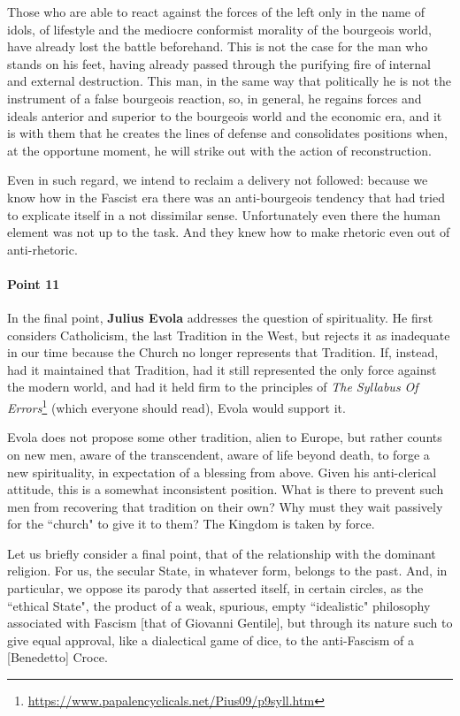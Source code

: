 Those who are able to react against the forces of the left only in the name of idols, of lifestyle and the mediocre conformist morality of the bourgeois world, have already lost the battle beforehand. This is not the case for the man who stands on his feet, having already passed through the purifying fire of internal and external destruction. This man, in the same way that politically he is not the instrument of a false bourgeois reaction, so, in general, he regains forces and ideals anterior and superior to the bourgeois world and the economic era, and it is with them that he creates the lines of defense and consolidates positions when, at the opportune moment, he will strike out with the action of reconstruction.

Even in such regard, we intend to reclaim a delivery not followed: because we know how in the Fascist era there was an anti-bourgeois tendency that had tried to explicate itself in a not dissimilar sense. Unfortunately even there the human element was not up to the task. And they knew how to make rhetoric even out of anti-rhetoric.

\paragraph{Point 11}
\begin{quotex}
In the final point, \textbf{Julius Evola} addresses the question of spirituality. He first considers Catholicism, the last Tradition in the West, but rejects it as inadequate in our time because the Church no longer represents that Tradition. If, instead, had it maintained that Tradition, had it still represented the only force against the modern world, and had it held firm to the principles of \textit{The Syllabus Of Errors}\footnote{\url{https://www.papalencyclicals.net/Pius09/p9syll.htm}} (which everyone should read), Evola would support it.

Evola does not propose some other tradition, alien to Europe, but rather counts on new men, aware of the transcendent, aware of life beyond death, to forge a new spirituality, in expectation of a blessing from above. Given his anti-clerical attitude, this is a somewhat inconsistent position. What is there to prevent such men from recovering that tradition on their own? Why must they wait passively for the ``church" to give it to them? The Kingdom is taken by force. 

\end{quotex}
Let us briefly consider a final point, that of the relationship with the dominant religion. For us, the secular State, in whatever form, belongs to the past. And, in particular, we oppose its parody that asserted itself, in certain circles, as the ``ethical State", the product of a weak, spurious, empty ``idealistic" philosophy associated with Fascism [that of Giovanni Gentile], but through its nature such to give equal approval, like a dialectical game of dice, to the anti-Fascism of a [Benedetto] Croce.

